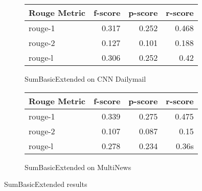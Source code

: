 \documentclass[../writeup.tex]{subfiles}
\begin{document}
\begin{figure}[H]
    \centering
    \begin{subfigure}{0.5\linewidth}
        \begin{tabular}{lrrr}
            \hline
            Rouge Metric & f-score & p-score & r-score \\
            \hline
            rouge-1      & 0.317   & 0.252   & 0.468   \\
            rouge-2      & 0.127   & 0.101   & 0.188   \\
            rouge-l      & 0.306   & 0.252   & 0.42    \\
            \hline
        \end{tabular}
        \caption{SumBasicExtended on CNN Dailymail}
    \end{subfigure}%
    \begin{subfigure}{0.5\linewidth}
        \begin{tabular}{lrrr}
            \hline
            Rouge Metric & f-score & p-score & r-score \\
            \hline
            rouge-1      & 0.339   & 0.275   & 0.475   \\
            rouge-2      & 0.107   & 0.087   & 0.15    \\
            rouge-l      & 0.278   & 0.234   & 0.36s   \\
            \hline
        \end{tabular}
        \caption{SumBasicExtended on MultiNews}
    \end{subfigure}
    \caption{SumBasicExtended results}
    \label{appendix:fig:results:sumbasic_extended_full}
\end{figure}
\end{document}
